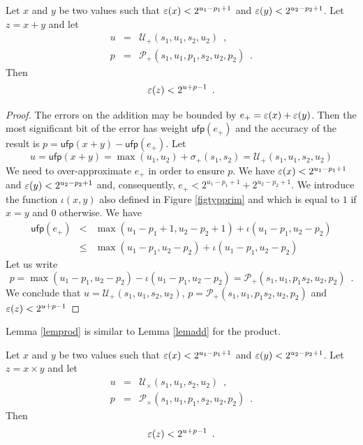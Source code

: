 \begin{lemma}\label{lemadd}
Let $x$ and $y$ be two values such that $\varepsilon(x)< 2^{u_1-p_1+1}$ and $\varepsilon(y)< 2^{u_2-p_2+1}$.
Let $z=x+y$ and let
\begin{equation}
\begin{array}{rcl}
u&=&\mathcal{U}_+(s_1,u_1,s_2,u_2)\enspace ,\\
p&=&\mathcal{P}_+(s_1,u_1,p_1,s_2,u_2,p_2)\enspace .
\end{array}
\end{equation}
Then 
\begin{equation}
\varepsilon(z)<2^{u+p-1}\enspace .
\end{equation}
\end{lemma}

\begin{proof}

 The errors on the addition may be bounded
by $e_+=\varepsilon(x)+\varepsilon(y)$. 
Then the most significant bit of the error has weight $\mathsf{ufp}(e_+)$
and the accuracy of the result is $p=\mathsf{ufp}(x + y)-\mathsf{ufp}(e_+)$.
Let 
$$
u=\mathsf{ufp}(x+y)=\max(u_1,u_2)+\sigma_+(s_1,s_2)=\mathcal{U}_+(s_1,u_1,s_2,u_2)
$$
We need to over-approximate $e_+$ in order to ensure $p$. 
We have
$
\varepsilon(x)< 2^{u_1-p_1+1}$ and $\varepsilon(y)< 2^{u_2-p_2+1}
$
and, consequently,
$
e_+ < 2^{u_1-p_1+1}+  2^{u_2-p_2+1}.
$
We introduce the function $\iota(x,y)$ also
defined in Figure \ref{figtypprim} and which is equal to $1$ if $x=y$ and $0$ otherwise.
 We have
$$
\begin{array}{rcl}
\mathsf{ufp}(e_+) &<& \max(u_1-p_1+1,u_2-p_2+1)+\iota(u_1-p_1,u_2-p_2) \\
          &\le& \max(u_1-p_1,u_2-p_2)+\iota(u_1-p_1,u_2-p_2)
\end{array}$$
Let us write
\begin{equation}
p = \max(u_1-p_1,u_2-p_2)-\iota(u_1-p_1,u_2-p_2)=\mathcal{P}_+(s_1,u_1,p_1s_2,u_2,p_2)\enspace .
\end{equation}
We conclude that
$u=\mathcal{U}_+(s_1,u_1,s_2,u_2)$, $p=\mathcal{P}_+(s_1,u_1,p_1s_2,u_2,p_2)$ and
$\varepsilon(z) < 2^{u+p-1}$
\end{proof}

Lemma \ref{lemprod} is similar to Lemma \ref{lemadd}  for the product. 

\begin{lemma}\label{lemprod}
Let $x$ and $y$ be two values such that $\varepsilon(x)< 2^{u_1-p_1+1}$ and $\varepsilon(y)< 2^{u_2-p_2+1}$.
Let $z=x\times y$ and let
\begin{equation}
\begin{array}{rcl}
u&=&\mathcal{U}_\times (s_1,u_1,s_2,u_2)\enspace ,\\
p&=&\mathcal{P}_\times (s_1,u_1,p_1,s_2,u_2,p_2)\enspace .
\end{array}
\end{equation}
Then 
\begin{equation}
\varepsilon(z)<2^{u+p-1}\enspace .
\end{equation}
\end{lemma}


